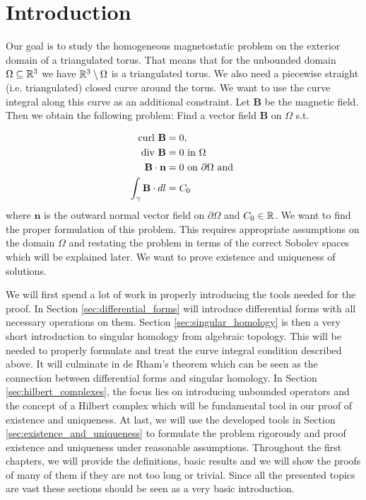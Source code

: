 \documentclass[../main.tex]{subfiles}
\begin{document}
\section{Introduction}
Our goal is to study the homogeneous magnetostatic problem on the exterior 
domain of a triangulated torus. That means 
that for the unbounded domain  $\Omega \subseteq \mathbb{R}^3$ we have
$\mathbb{R}^3 \setminus \Omega$ is a triangulated torus. We also need a 
piecewise straight (i.e. triangulated) closed curve around the torus.
We want to use the curve integral along this curve as an additional 
constraint.
Let $\mathbf{B}$ be the magnetic field. Then we obtain the following problem:
Find a vector field $\mathbf{B}$ on $\Omega$ s.t.

\begin{align}
    \operatorname{curl} \, \mathbf{B} &= 0, \\ 
    \operatorname{div} \, \mathbf{B}  &= 0 \text{ in } \Omega \\
    \mathbf{B} \cdot \mathbf{n} &= 0 \text{ on } \partial \Omega \text{ and }\\
    \int_\gamma \mathbf{B} \cdot dl &= C_0
\end{align}
where $\mathbf{n}$ is the outward normal vector field on $\partial \Omega$ and 
$C_0 \in \mathbb{R}$. 
We want to find the proper formulation of this problem. This requires 
appropriate assumptions on the domain $\Omega$ and restating the problem
in terms of the correct Sobolev spaces which will be explained later.
We want to prove existence and uniqueness of 
solutions. 

We will first spend a lot of work in properly introducing the tools needed for the proof.
In Section \ref{sec:differential_forms} will introduce differential forms with 
all necessary operations on them. Section \ref{sec:singular_homology} is then a very short
introduction to  
singular homology from algebraic topology. This will be needed to properly formulate and treat the
curve integral condition described above. It will culminate in de Rham's theorem 
which can be seen as the connection between differential forms and singular homology.
In Section \ref{sec:hilbert_complexes}, the focus lies on introducing 
unbounded operators and the concept of a Hilbert complex which will be 
fundamental tool in our proof of existence and uniqueness. At last, we will 
use the developed tools in Section \ref{sec:existence_and_uniqueness} 
to formulate the problem rigorously and proof existence and uniqueness under 
reasonable assumptions. Throughout the first chapters, we will provide the 
definitions, basic results and we will show the proofs of many of them if they are not too 
long or trivial. Since all the presented topics are vast these sections should be 
seen as a very basic introduction.
\end{document}
